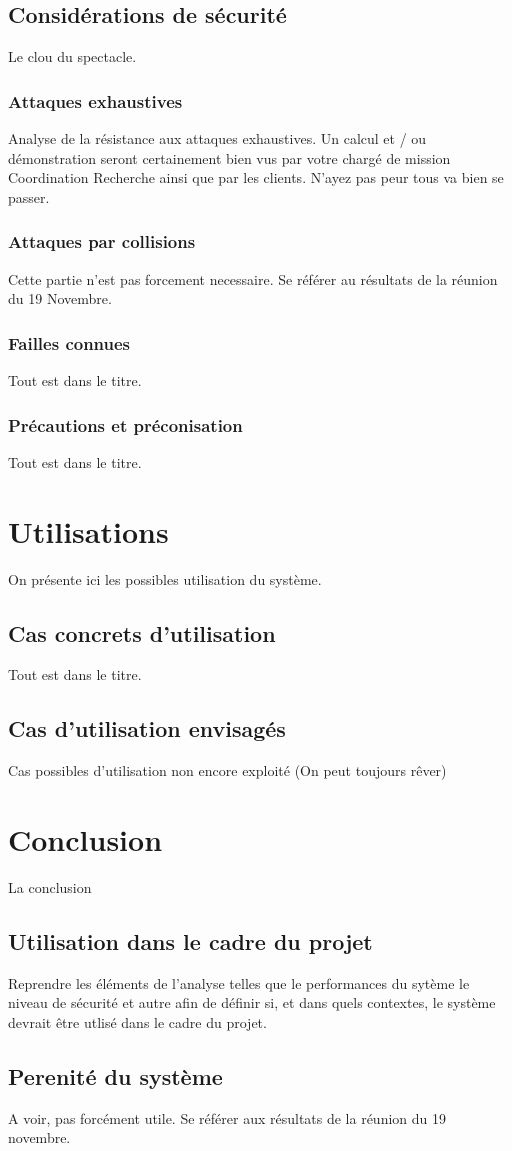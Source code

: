 \documentclass{../res/univ-projet}
\begin{document}
  \subsection{Considérations de sécurité}
  Le clou du spectacle.
    \subsubsection{Attaques exhaustives}
    Analyse de la résistance aux attaques exhaustives. Un calcul et / ou démonstration seront certainement bien vus par votre chargé de mission 
    \og{}Coordination Recherche\fg{} ainsi que par les clients. N'ayez pas peur tous va bien se passer.
    
    \subsubsection{Attaques par collisions}
    Cette partie n'est pas forcement necessaire. Se référer au résultats de la réunion du 19 Novembre.
    
    \subsubsection{Failles connues}
    Tout est dans le titre.
    
    \subsubsection{Précautions et préconisation}
    Tout est dans le titre.
    
\section{Utilisations}
On présente ici les possibles utilisation du système.
  \subsection{Cas concrets d'utilisation}
  Tout est dans le titre.
  
  \subsection{Cas d'utilisation envisagés}
  Cas possibles d'utilisation non encore exploité (On peut toujours r\^ever)
  
\section{Conclusion}
La conclusion
  \subsection{Utilisation dans le cadre du projet}
  Reprendre les éléments de l'analyse telles que le performances du sytème le niveau de sécurité et autre afin de définir si, et dans quels contextes, le système devrait
  \^etre utlisé dans le cadre du projet.
  
  \subsection{Perenité du système}
  A voir, pas forcément utile. Se référer aux résultats de la réunion du 19 novembre.
    
\end{document}
